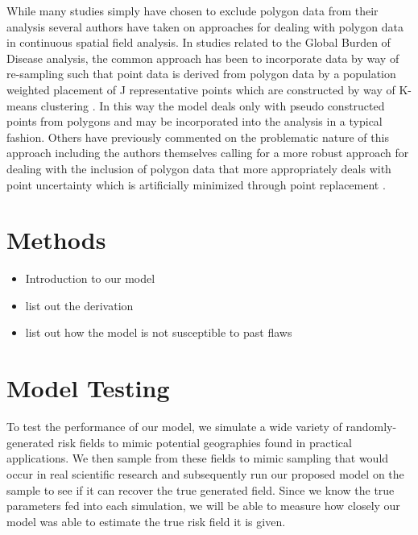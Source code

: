 \documentclass{article}
\begin{document}
While many studies simply have chosen to exclude polygon data from their analysis several authors have taken on approaches for dealing with polygon data in continuous spatial field analysis. In studies related to the Global Burden of Disease analysis, the common approach has been to incorporate data by way of re-sampling such that point data is derived from polygon data by a population weighted placement of J representative points which are constructed by way of K-means clustering \cite{Golding2017, Reiner2018}. In this way the model deals only with pseudo constructed points from polygons and may be incorporated into the analysis in a typical fashion. Others have previously commented on the problematic nature of this approach \cite{Wakefield2017} including the authors themselves calling for a more robust approach for dealing with the inclusion of polygon data that more appropriately deals with point uncertainty which is artificially minimized through point replacement \cite{Golding2017}.



\section{Methods}\label{methods}

\begin{itemize}
\item Introduction to our model
\item list out the derivation
\item list out how the model is not susceptible to past flaws
\end{itemize}










\section{Model Testing}\label{model testing}

To test the performance of our model, we simulate a wide variety of randomly-generated risk fields to mimic potential geographies found in practical applications. We then sample from these fields to mimic sampling that would occur in real scientific research and subsequently run our proposed model on the sample to see if it can recover the true generated field. Since we know the true parameters fed into each simulation, we will be able to measure how closely our model was able to estimate the true risk field it is given.
\end{document}

